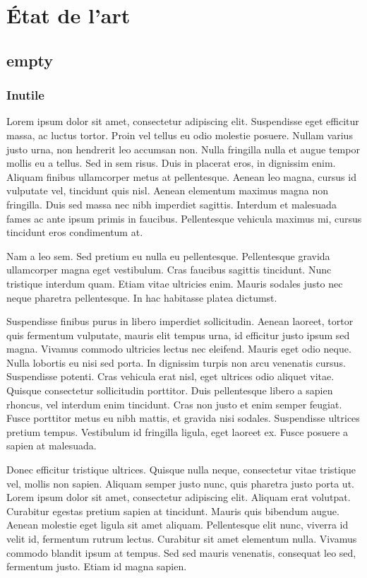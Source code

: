 \documentclass[12pt,french,a4paper]{report}
\begin{document}
\tableofcontents
\clearpage

\part{État de l'art}
\chapter{empty}
\section{Inutile}


Lorem ipsum dolor sit amet, consectetur adipiscing elit. Suspendisse eget efficitur massa, ac luctus tortor. Proin vel tellus eu odio molestie posuere. Nullam varius justo urna, non hendrerit leo accumsan non. Nulla fringilla nulla et augue tempor mollis eu a tellus. Sed in sem risus. Duis in placerat eros, in dignissim enim. Aliquam finibus ullamcorper metus at pellentesque. Aenean leo magna, cursus id vulputate vel, tincidunt quis nisl. Aenean elementum maximus magna non fringilla. Duis sed massa nec nibh imperdiet sagittis. Interdum et malesuada fames ac ante ipsum primis in faucibus. Pellentesque vehicula maximus mi, cursus tincidunt eros condimentum at.

Nam a leo sem. Sed pretium eu nulla eu pellentesque. Pellentesque gravida ullamcorper magna eget vestibulum. Cras faucibus sagittis tincidunt. Nunc tristique interdum quam. Etiam vitae ultricies enim. Mauris sodales justo nec neque pharetra pellentesque. In hac habitasse platea dictumst.

Suspendisse finibus purus in libero imperdiet sollicitudin. Aenean laoreet, tortor quis fermentum vulputate, mauris elit tempus urna, id efficitur justo ipsum sed magna. Vivamus commodo ultricies lectus nec eleifend. Mauris eget odio neque. Nulla lobortis eu nisi sed porta. In dignissim turpis non arcu venenatis cursus. Suspendisse potenti. Cras vehicula erat nisl, eget ultrices odio aliquet vitae. Quisque consectetur sollicitudin porttitor. Duis pellentesque libero a sapien rhoncus, vel interdum enim tincidunt. Cras non justo et enim semper feugiat. Fusce porttitor metus eu nibh mattis, et gravida nisi sodales. Suspendisse ultrices pretium tempus. Vestibulum id fringilla ligula, eget laoreet ex. Fusce posuere a sapien at malesuada.

Donec efficitur tristique ultrices. Quisque nulla neque, consectetur vitae tristique vel, mollis non sapien. Aliquam semper justo nunc, quis pharetra justo porta ut. Lorem ipsum dolor sit amet, consectetur adipiscing elit. Aliquam erat volutpat. Curabitur egestas pretium sapien at tincidunt. Mauris quis bibendum augue. Aenean molestie eget ligula sit amet aliquam. Pellentesque elit nunc, viverra id velit id, fermentum rutrum lectus. Curabitur sit amet elementum nulla. Vivamus commodo blandit ipsum at tempus. Sed sed mauris venenatis, consequat leo sed, fermentum justo. Etiam id magna sapien.
\end{document}
